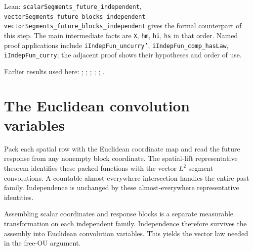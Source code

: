\documentclass[11pt,a4paper]{article}
\begin{document}
\begin{leanbox}{Lean: \texttt{scalarSegments\_\allowbreak{}future\_\allowbreak{}independent}, \texttt{vectorSegments\_\allowbreak{}future\_\allowbreak{}blocks\_\allowbreak{}independent}}
\texttt{vector\allowbreak{}Segments\_\allowbreak{}future\_\allowbreak{}blocks\_\allowbreak{}independent} gives the formal counterpart of this step. The main intermediate facts are \texttt{X}, \texttt{hm}, \texttt{hi}, \texttt{hs} in that order. Named proof applications include \texttt{i\allowbreak{}Indep\allowbreak{}Fun\_\allowbreak{}uncurry'}, \texttt{i\allowbreak{}Indep\allowbreak{}Fun\_\allowbreak{}comp\_\allowbreak{}has\allowbreak{}Law}, \texttt{i\allowbreak{}Indep\allowbreak{}Fun\_\allowbreak{}curry}; the adjacent proof shows their hypotheses and order of use.
\end{leanbox}


Earlier results used here: \cite[Section~3.6.12]{LangevinLean2026ULASC}; \cite[Section~3.6.25]{LangevinLean2026ULASC}; \cite[Section~3.7.2]{LangevinLean2026ULASC}; \cite[Section~3.8.16]{LangevinLean2026ULASC}; \cite[Section~3.8.17]{LangevinLean2026ULASC}; \cite[Section~3.8.5]{LangevinLean2026ULASC}.

\section{\texorpdfstring{The Euclidean convolution variables}{The Euclidean convolution variables}}


Pack each spatial row with the Euclidean coordinate map and read the future response from any nonempty block coordinate. The spatial-lift representative theorem identifies these packed functions with the vector \(L^{2}\) segment convolutions. A countable almost-everywhere intersection handles the entire past family. Independence is unchanged by these almost-everywhere representative identities.



Assembling scalar coordinates and response blocks is a separate measurable transformation on each independent family. Independence therefore survives the assembly into Euclidean convolution variables. This yields the vector law needed in the free-OU argument.
\end{document}
